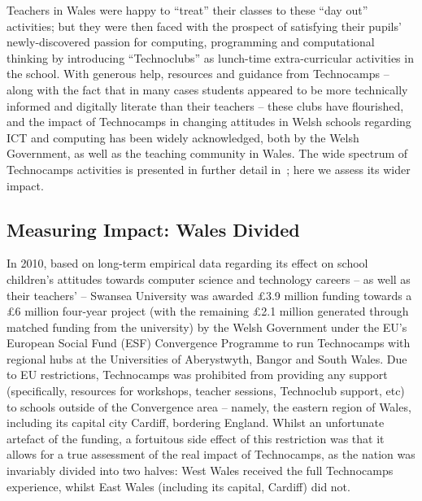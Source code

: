 \documentclass{llncs}
\begin{document}
Teachers in Wales were happy to ``treat'' their classes to these ``day
out'' activities; but they were then faced with the prospect of
satisfying their pupils' newly-discovered passion for computing,
programming and computational thinking by introducing ``Technoclubs''
as lunch-time extra-curricular activities in the school.  With
generous help, resources and guidance from Technocamps -- along with
the fact that in many cases students appeared to be more technically
informed and digitally literate than their teachers -- these clubs
have flourished, and the impact of Technocamps in changing attitudes
in Welsh schools regarding ICT and computing has been widely
acknowledged, both by the Welsh Government, as well as the teaching
community in Wales.  The wide spectrum of Technocamps activities is
presented in further detail in~\cite{crick+moller-wipsce2015}; here we
assess its wider impact.

\subsection{Measuring Impact: Wales Divided}
\label{walesdivided}

In 2010, based on long-term empirical data regarding its effect on
school children's attitudes towards computer science and technology
careers -- as well as their teachers' -- Swansea University was
awarded \pounds 3.9 million funding towards a \pounds 6 million
four-year project (with the remaining \pounds 2.1 million generated
through matched funding from the university) by the Welsh Government
under the EU's European Social Fund (ESF) Convergence Programme to run
Technocamps with regional hubs at the Universities of Aberystwyth,
Bangor and South Wales.  Due to EU
restrictions, Technocamps was prohibited from providing any support
(specifically, resources for workshops, teacher sessions, Technoclub
support, etc) to schools outside of the Convergence area -- namely,
the eastern region of Wales, including its capital city Cardiff,
bordering England.  Whilst an unfortunate artefact of the funding, a
fortuitous side effect of this restriction was that it allows for a
true assessment of the real impact of Technocamps, as the nation was
invariably divided into two halves: West Wales received the full
Technocamps experience, whilst East Wales (including its capital,
Cardiff) did not.
\end{document}
